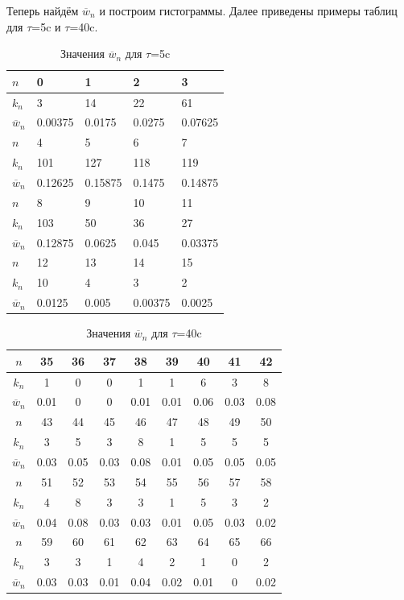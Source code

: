 \documentclass[12pt,a4paper]{article}
\begin{document}
Теперь найдём $\overline{w}_n$ и построим гистограммы. Далее приведены примеры таблиц для $\tau$=5c и $\tau$=40c.
\newpage
\begin{table}[!ht]
    \centering
    \caption{Значения $\overline{w}_n$ для $\tau$=5c}
    \begin{tabular}{|l|l|l|l|l|}
    \hline
        $n$ & 0 & 1 & 2 & 3 \\ \hline
        $k_n$ & 3 & 14 & 22 & 61 \\ \hline
        $\overline{w}_n$ & 0.00375 & 0.0175 & 0.0275 & 0.07625 \\ \hline
        $n$ & 4 & 5 & 6 & 7 \\ \hline
        $k_n$ & 101 & 127 & 118 & 119 \\ \hline
        $\overline{w}_n$ & 0.12625 & 0.15875 & 0.1475 & 0.14875 \\ \hline
        $n$ & 8 & 9 & 10 & 11 \\ \hline
        $k_n$ & 103 & 50 & 36 & 27 \\ \hline
        $\overline{w}_n$ & 0.12875 & 0.0625 & 0.045 & 0.03375 \\ \hline
        $n$ & 12 & 13 & 14 & 15 \\ \hline
        $k_n$ & 10 & 4 & 3 & 2 \\ \hline
        $\overline{w}_n$ & 0.0125 & 0.005 & 0.00375 & 0.0025 \\ \hline
    \end{tabular}
\end{table}
\begin{table}[!ht]
    \centering
    \caption{Значения $\overline{w}_n$ для $\tau$=40c}
    \begin{tabular}{|c|c|c|c|c|c|c|c|c|}
    \hline
        $n$ & 35 & 36 & 37 & 38 & 39 & 40 & 41 & 42 \\ \hline
        $k_n$ & 1 & 0 & 0 & 1 & 1 & 6 & 3 & 8 \\ \hline
        $\overline{w}_n$ & 0.01 & 0 & 0 & 0.01 & 0.01 & 0.06 & 0.03 & 0.08 \\ \hline
        $n$ & 43 & 44 & 45 & 46 & 47 & 48 & 49 & 50 \\ \hline
        $k_n$ & 3 & 5 & 3 & 8 & 1 & 5 & 5 & 5 \\ \hline
        $\overline{w}_n$ & 0.03 & 0.05 & 0.03 & 0.08 & 0.01 & 0.05 & 0.05 & 0.05 \\ \hline
        $n$ & 51 & 52 & 53 & 54 & 55 & 56 & 57 & 58 \\ \hline
        $k_n$ & 4 & 8 & 3 & 3 & 1 & 5 & 3 & 2 \\ \hline
        $\overline{w}_n$ & 0.04 & 0.08 & 0.03 & 0.03 & 0.01 & 0.05 & 0.03 & 0.02 \\ \hline
        $n$ & 59 & 60 & 61 & 62 & 63 & 64 & 65 & 66 \\ \hline
        $k_n$ & 3 & 3 & 1 & 4 & 2 & 1 & 0 & 2 \\ \hline
        $\overline{w}_n$ & 0.03 & 0.03 & 0.01 & 0.04 & 0.02 & 0.01 & 0 & 0.02 \\ \hline
    \end{tabular}
\end{table}
\end{document}
